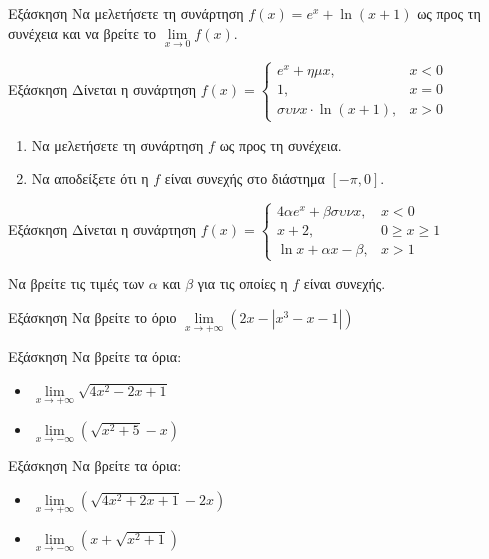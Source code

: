 \documentclass[greek]{beamer}
\begin{document}
\begin{frame}{Εξάσκηση}
 Να μελετήσετε τη συνάρτηση $f(x)=e^x+\ln (x+1)$ ως προς τη συνέχεια και να βρείτε το $\lim\limits_{x \to 0}{ f(x) }$.
\end{frame}

\begin{frame}{Εξάσκηση}
 Δίνεται η συνάρτηση $f(x)=\begin{cases}
   e^x+ημx,             & x<0  \\
   1,                   & x=0 \\
   συνx\cdot \ln (x+1), & x>0
  \end{cases}$
  \begin{enumerate}
    \item Να μελετήσετε τη συνάρτηση $f$ ως προς τη συνέχεια.
    \item Να αποδείξετε ότι η $f$ είναι συνεχής στο διάστημα $[-π,0]$.
  \end{enumerate}
\end{frame}

\begin{frame}{Εξάσκηση}
 Δίνεται η συνάρτηση $f(x)=\begin{cases}
   4αe^x+βσυνx,             & x<0  \\
   x+2,                   & 0\ge x\ge 1 \\
   \ln x+αx-β, & x>1
  \end{cases}$

  Να βρείτε τις τιμές των $α$ και $β$ για τις οποίες η $f$ είναι συνεχής.
\end{frame}

\begin{frame}{Εξάσκηση}
 Να βρείτε το όριο $\lim\limits_{x \to +\infty}{ \left( 2x-|x^3-x-1| \right)  }$
\end{frame}

\begin{frame}{Εξάσκηση}
 Να βρείτε τα όρια:
 \begin{itemize}
  \item $\lim\limits_{x \to +\infty}{ \sqrt{4x^2-2x+1} }$ \pause
  \item $\lim\limits_{x \to -\infty}{ \left( \sqrt{x^2+5} -x \right)  }$
 \end{itemize}
\end{frame}

\begin{frame}{Εξάσκηση}
 Να βρείτε τα όρια:
 \begin{itemize}
  \item $\lim\limits_{x \to +\infty}{ \left( \sqrt{4x^2+2x+1}-2x \right)  }$ \pause
  \item $\lim\limits_{x \to -\infty}{ \left( x+ \sqrt{x^2+1} \right)  }$
 \end{itemize}
\end{frame}
\end{document}
